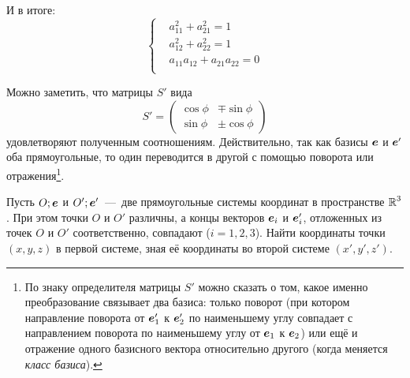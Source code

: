 \documentclass[a4paper,12pt]{article}
\begin{document}
\begin{solution}
    И в итоге:
    \[
      \left\{
        \begin{aligned}
          &a_{11}^2 + a_{21}^2 = 1\\
          &a_{12}^2 + a_{22}^2 = 1\\
          &a_{11} a_{12} + a_{21} a_{22} = 0\\
        \end{aligned}
      \right.
    \]
    
    Можно заметить, что матрицы $S'$ вида
    \[
      S' = \begin{pmatrix}
        \cos \phi & \mp \sin \phi\\
        \sin \phi & \pm \cos \phi
      \end{pmatrix}
    \]
    удовлетворяют полученным соотношениям.
    Действительно, так как базисы $\boldsymbol e$ и $\boldsymbol e'$ оба прямоугольные, то один переводится в другой с помощью поворота или отражения\footnote{По знаку определителя матрицы $S'$ можно сказать о том, какое именно преобразование связывает два базиса: только поворот (при котором направление поворота от $\boldsymbol e_1'$ к $\boldsymbol e_2'$ по наименьшему углу совпадает с направлением поворота по наименьшему углу от $\boldsymbol e_1$ к $\boldsymbol e_2$) или ещё и отражение одного базисного вектора относительно другого (когда меняется \emph{класс базиса}).}.
  \end{solution}
  
  
  \begin{problem}[4.30]
    Пусть $O; \boldsymbol e$ и $O'; \boldsymbol e'$~---~две прямоугольные системы координат в пространстве $\operatorname{\mathbb R}^3$.
    При этом точки $O$ и $O'$ различны, а концы векторов $\boldsymbol e_i$ и $\boldsymbol e_i'$, отложенных из точек $O$ и $O'$ соответственно, совпадают ($i = 1, 2, 3$).
    Найти координаты точки $(x, y, z)$ в первой системе, зная её координаты во второй системе $(x', y', z')$.
  \end{problem}
  
\end{document}
